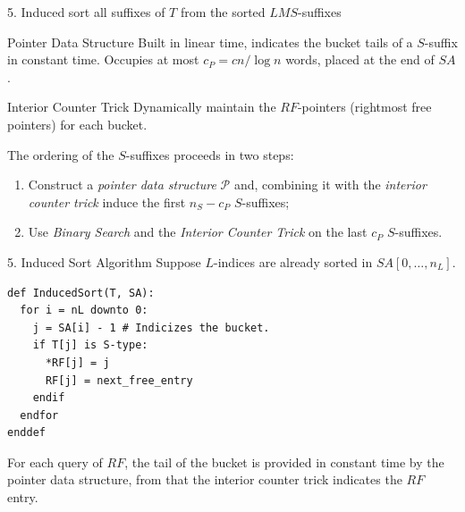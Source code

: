 \documentclass{beamer}
\begin{document}
  \begin{frame}{5. Induced sort all suffixes of $T$ from the sorted $LMS$-suffixes}\label{5}
    \begin{block}{Pointer Data Structure}
      \vspace{1pt}
      Built in linear time, indicates the bucket tails of a $S$-suffix in constant time. Occupies at most $c_P = cn/\log n$ words, placed at the end of $SA$. \hyperlink{AUX5.pointer}{}
    \end{block}
    \begin{block}{Interior Counter Trick}
      \vspace{1pt}
      Dynamically maintain the $RF$-pointers (rightmost free pointers) for each bucket. \hyperlink{AUX5.counter}{}
    \end{block}
    \pause
    The ordering of the $S$-suffixes proceeds in two steps:
    \begin{enumerate}
      \item Construct a \textit{pointer data structure} $\mathcal{P}$ and, combining it with the \textit{interior counter trick} induce the first $n_S - c_P$ $S$-suffixes;
      \item Use \textit{Binary Search} and the \textit{Interior Counter Trick} on the last $c_P$ $S$-suffixes.
    \end{enumerate}
  \end{frame}


  \begin{frame}[fragile]{5. Induced Sort Algorithm}
    Suppose $L$-indices are already sorted in $SA[0, \dots , n_L]$.
    \begin{lstlisting}
def InducedSort(T, SA):
  for i = nL downto 0:
    j = SA[i] - 1 # Indicizes the bucket.
    if T[j] is S-type:
      *RF[j] = j
      RF[j] = next_free_entry
    endif
  endfor
enddef
    \end{lstlisting}

    For each query of $RF$, the tail of the bucket is provided in constant time by the pointer data structure, from that the interior counter trick indicates the $RF$ entry.
  \end{frame}
\end{document}
